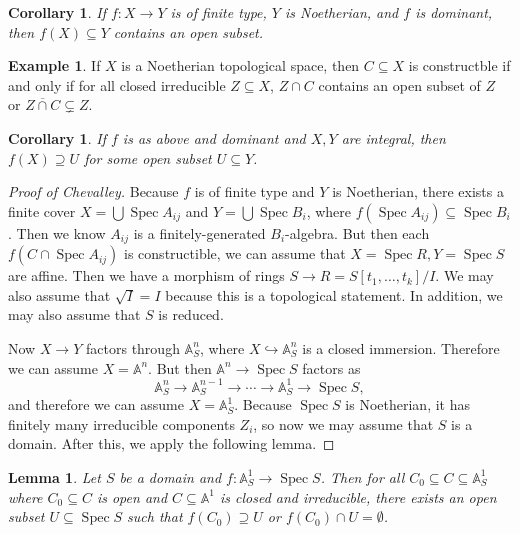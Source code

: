 \documentclass[leqno, openany]{memoir}
\newtheorem{cor}[thm]{Corollary}
\newtheorem{lem}[thm]{Lemma}
\theoremstyle{definition}
\newtheorem{exm}[thm]{Example}
\theoremstyle{remark}
\theoremstyle{plain}
\theoremstyle{definition}
\theoremstyle{remark}
\newcommand{\A}{\mathbb{A}}
\newcommand{\ol}[1]{\overline{#1}}
\DeclareMathOperator{\Spec}{Spec}
\begin{document}
\begin{cor} If $f \colon X \to Y$ is of finite type, $Y$ is Noetherian, and $f$
is dominant, then $f(X) \subseteq Y$ contains an open subset.  \end{cor}

\begin{exm} If $X$ is a Noetherian topological space, then $C \subseteq X$ is
constructble if and only if for all closed irreducible $Z \subseteq X$, $Z \cap
C$ contains an open subset of $Z$ or $\ol{Z \cap C} \subsetneq Z$.  \end{exm}

\begin{cor} If $f$ is as above and dominant and $X,Y$ are integral, then $f(X)
\supseteq U$ for some open subset $U \subseteq Y$.  \end{cor}

\begin{proof}[Proof of Chevalley] Because $f$ is of finite type and $Y$ is
    Noetherian, there exists a finite cover $X = \bigcup \Spec A_{ij}$ and $Y =
    \bigcup \Spec B_i$, where $f(\Spec A_{ij}) \subseteq \Spec B_i$. Then we
    know $A_{ij}$ is a finitely-generated $B_i$-algebra. But then each $f(C
    \cap \Spec A_{ij})$ is constructible, we can assume that $X = \Spec R, Y =
    \Spec S$ are affine. Then we have a morphism of rings $S \to R = S[t_1,
    \ldots, t_k] / I$. We may also assume that $\sqrt{I} = I$ because this is a
    topological statement. In addition, we may also assume that $S$ is reduced.

    Now $X \to Y$ factors through $\A^n_S$, where $X \hookrightarrow \A^n_S$ is
    a closed immersion. Therefore we can assume $X = \A^n$. But then $\A^n \to
    \Spec S$ factors as \[ \A^n_S \to \A^{n-1}_S \to \cdots \to \A^1_S \to
    \Spec S, \] and therefore we can assume $X = \A^1_S$. Because $\Spec S$ is
    Noetherian, it has finitely many irreducible components $Z_i$, so now we
    may assume that $S$ is a domain. After this, we apply the following lemma.
\end{proof}

\begin{lem} Let $S$ be a domain and $f \colon \A^1_S \to \Spec S$. Then for all
    $C_0 \subseteq C \subseteq \A^1_S$ where $C_0 \subseteq C$ is open and $C
    \subseteq \A^1$ is closed and irreducible, there exists an open subset $U
    \subseteq \Spec S$ such that $f(C_0) \supseteq U$ or $f(C_0) \cap U =
    \emptyset$.  \end{lem}
\end{document}
